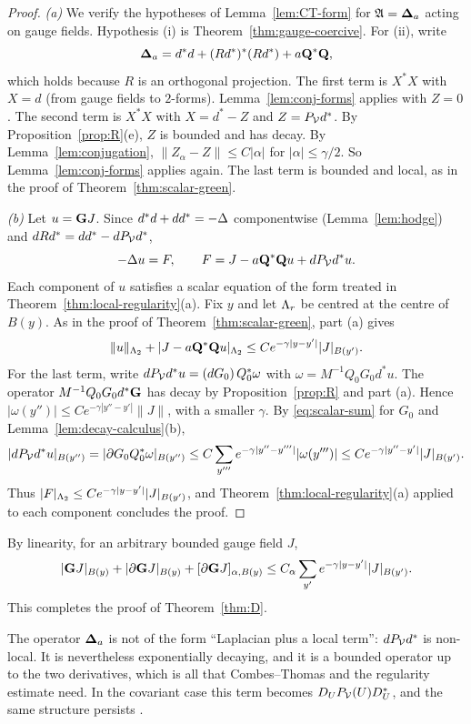\begin{proof}
\emph{(a)} We verify the hypotheses of Lemma~\ref{lem:CT-form} for $\mathfrak A=\boldsymbol{\Delta}_a$ acting on gauge fields. Hypothesis (i) is Theorem~\ref{thm:gauge-coercive}. For (ii), write
\[
\boldsymbol{\Delta}_a=d^*d+(Rd^*)^*(Rd^*)+a\mathbf Q^*\mathbf Q,
\]
which holds because $R$ is an orthogonal projection. The first term is $X^*X$ with $X=d$ (from gauge fields to $2$-forms). Lemma~\ref{lem:conj-forms} applies with $Z=0$. The second term is $X^*X$ with $X=d^*-Z$ and $Z=P_\mathcal V d^*$. By Proposition~\ref{prop:R}(e), $Z$ is bounded and has decay. By Lemma~\ref{lem:conjugation}, $\|Z_\alpha-Z\|\le C|\alpha|$ for $|\alpha|\le\gamma/2$. So Lemma~\ref{lem:conj-forms} applies again. The last term is bounded and local, as in the proof of Theorem~\ref{thm:scalar-green}.

\emph{(b)} Let $u=\mathbf G J$. Since $d^*d+dd^*=-\Delta$ componentwise (Lemma~\ref{lem:hodge}) and $dRd^*=dd^*-dP_\mathcal V d^*$,
\[
-\Delta u=F,\qquad F=J-a\mathbf Q^*\mathbf Q u+dP_\mathcal V d^*u .
\]
Each component of $u$ satisfies a scalar equation of the form treated in Theorem~\ref{thm:local-regularity}(a). Fix $y$ and let $\Lambda_r$ be centred at the centre of $B(y)$. As in the proof of Theorem~\ref{thm:scalar-green}, part (a) gives
\[
\|u\|_{\Lambda_2}+|J-a\mathbf Q^*\mathbf Q u|_{\Lambda_2}\le Ce^{-\gamma|y-y'|}|J|_{B(y')} .
\]
For the last term, write $dP_\mathcal V d^*u=(dG_0)\,Q_0^*\omega$ with $\omega=M^{-1}Q_0G_0d^*u$. The operator $M^{-1}Q_0G_0d^*\mathbf G$ has decay by Proposition~\ref{prop:R} and part (a). Hence $|\omega(y'')|\le Ce^{-\gamma|y''-y'|}\|J\|$, with a smaller $\gamma$. By \eqref{eq:scalar-sum} for $G_0$ and Lemma~\ref{lem:decay-calculus}(b),
\[
|dP_\mathcal V d^*u|_{B(y'')}=|\partial G_0Q_0^*\omega|_{B(y'')}\le C\sum_{y'''}e^{-\gamma|y''-y'''|}|\omega(y''')|\le Ce^{-\gamma|y''-y'|}|J|_{B(y')} .
\]
Thus $|F|_{\Lambda_2}\le Ce^{-\gamma|y-y'|}|J|_{B(y')}$, and Theorem~\ref{thm:local-regularity}(a) applied to each component concludes the proof.
\end{proof}

By linearity, for an arbitrary bounded gauge field $J$,
\begin{equation}\label{eq:gauge-sum}
|\mathbf G J|_{B(y)}+|\partial\mathbf G J|_{B(y)}+[\partial\mathbf G J]_{\alpha,B(y)}\le C_\alpha\sum_{y'}e^{-\gamma|y-y'|}|J|_{B(y')} .
\end{equation}
This completes the proof of Theorem~\ref{thm:D}.

\begin{remark}
The operator $\boldsymbol{\Delta}_a$ is not of the form ``Laplacian plus a local term'': $dP_\mathcal V d^*$ is non-local. It is nevertheless exponentially decaying, and it is a bounded operator up to the two derivatives, which is all that Combes--Thomas and the regularity estimate need. In the covariant case this term becomes $D_UP_\mathcal V(U)D_U^*$, and the same structure persists \cite{BalBackground}.
\end{remark}
